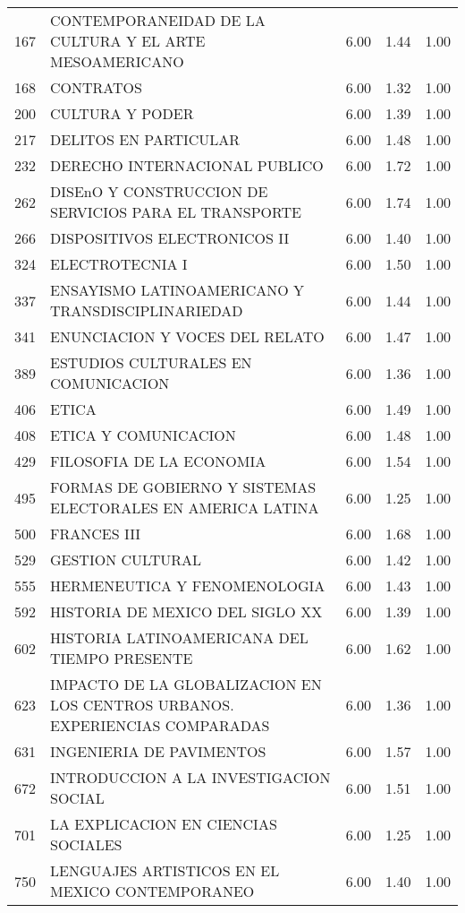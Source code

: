 \documentclass[12pt]{article}
\begin{document}
\begin{table}[ht]
\begin{tabular}{rlrrr}
  167 & CONTEMPORANEIDAD DE LA CULTURA Y EL ARTE MESOAMERICANO & 6.00 & 1.44 & 1.00 \\ 
  168 & CONTRATOS & 6.00 & 1.32 & 1.00 \\ 
  200 & CULTURA Y PODER & 6.00 & 1.39 & 1.00 \\ 
  217 & DELITOS EN PARTICULAR & 6.00 & 1.48 & 1.00 \\ 
  232 & DERECHO INTERNACIONAL PUBLICO & 6.00 & 1.72 & 1.00 \\ 
  262 & DISEnO Y CONSTRUCCION DE SERVICIOS PARA EL TRANSPORTE & 6.00 & 1.74 & 1.00 \\ 
  266 & DISPOSITIVOS ELECTRONICOS II & 6.00 & 1.40 & 1.00 \\ 
  324 & ELECTROTECNIA I & 6.00 & 1.50 & 1.00 \\ 
  337 & ENSAYISMO LATINOAMERICANO Y TRANSDISCIPLINARIEDAD & 6.00 & 1.44 & 1.00 \\ 
  341 & ENUNCIACION Y VOCES DEL RELATO & 6.00 & 1.47 & 1.00 \\ 
  389 & ESTUDIOS CULTURALES EN COMUNICACION & 6.00 & 1.36 & 1.00 \\ 
  406 & ETICA & 6.00 & 1.49 & 1.00 \\ 
  408 & ETICA Y COMUNICACION & 6.00 & 1.48 & 1.00 \\ 
  429 & FILOSOFIA DE LA ECONOMIA & 6.00 & 1.54 & 1.00 \\ 
  495 & FORMAS DE GOBIERNO Y SISTEMAS ELECTORALES EN AMERICA LATINA & 6.00 & 1.25 & 1.00 \\ 
  500 & FRANCES III & 6.00 & 1.68 & 1.00 \\ 
  529 & GESTION CULTURAL & 6.00 & 1.42 & 1.00 \\ 
  555 & HERMENEUTICA Y FENOMENOLOGIA & 6.00 & 1.43 & 1.00 \\ 
  592 & HISTORIA DE MEXICO DEL SIGLO XX & 6.00 & 1.39 & 1.00 \\ 
  602 & HISTORIA LATINOAMERICANA DEL TIEMPO PRESENTE & 6.00 & 1.62 & 1.00 \\ 
  623 & IMPACTO DE LA GLOBALIZACION EN LOS CENTROS URBANOS. EXPERIENCIAS COMPARADAS & 6.00 & 1.36 & 1.00 \\ 
  631 & INGENIERIA DE PAVIMENTOS & 6.00 & 1.57 & 1.00 \\ 
  672 & INTRODUCCION A LA INVESTIGACION SOCIAL & 6.00 & 1.51 & 1.00 \\ 
  701 & LA EXPLICACION EN CIENCIAS SOCIALES & 6.00 & 1.25 & 1.00 \\ 
  750 & LENGUAJES ARTISTICOS EN EL MEXICO CONTEMPORANEO & 6.00 & 1.40 & 1.00 \\ 

\end{tabular}
\end{table}
\end{document}
